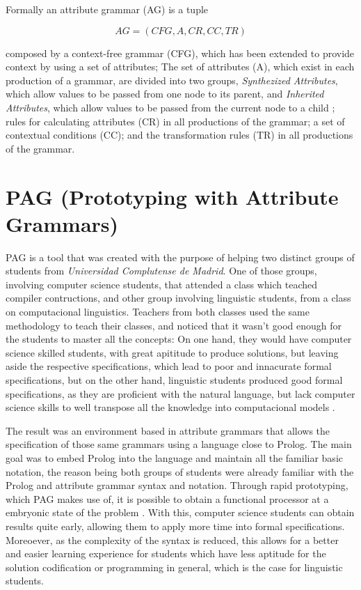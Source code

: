 \noindent Formally an attribute grammar (AG) is a tuple \cite{pereira_2016}

\[ AG = (CFG, A, CR, CC, TR) \]

\noindent composed by a context-free grammar (CFG), which has been extended to provide context by using a set of attributes; 
The set of attributes (A), which exist in each production of a grammar, are divided into two groups, \emph{Synthezized Attributes}, which allow values to be passed from one node to its parent, 
and \emph{Inherited Attributes}, which allow values to be passed from the current node to a child \cite{slonneger_1995}; 
rules for calculating attributes (CR) in all productions of the grammar; 
a set of contextual conditions (CC); 
and the transformation rules (TR) in all productions of the grammar.


\section{PAG (Prototyping with Attribute Grammars)}
PAG is a tool that was created with the purpose of helping two distinct groups of students from \emph{Universidad Complutense de Madrid}. 
One of those groups, involving computer science students, that attended a class which teached compiler contructions, and other group involving linguistic students, from a class on computacional linguistics. 
Teachers from both classes used the same methodology to teach their classes, 
and noticed that it wasn't good enough for the students to master all the concepts: On one hand, they would have computer science skilled students, 
with great apititude to produce solutions, but leaving aside the respective specifications, which lead to poor and innacurate formal specifications, but on the other hand, 
linguistic students produced good formal specifications, as they are proficient with the natural language,
but lack computer science skills to well transpose all the knowledge into computacional models \cite{sierra_2006}.
	
The result was an environment based in attribute grammars that allows the specification of those same grammars using a language close to Prolog. 
The main goal was to embed Prolog into the language and maintain all the familiar basic notation, 
the reason being both groups of students were already familiar with the Prolog and attribute grammar syntax and notation. 
Through rapid prototyping, which PAG makes use of, it is possible to obtain a functional processor at a embryonic state of the problem \cite{sierra_2006}. 
With this, computer science students can obtain results quite early, allowing them to apply more time into formal specifications. 
Moreoever, as the complexity of the syntax is reduced, this allows for a better and easier learning experience for students which have less aptitude for the solution codification or programming in general, 
which is the case for linguistic students.

